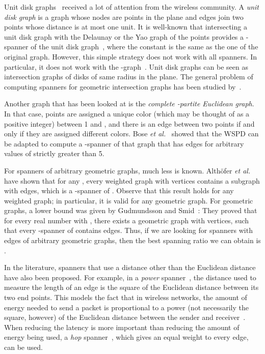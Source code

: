 \documentclass[pdftex,leqno,fleqn,12pt]{article}
\newcommand{\etal}{\textit{et al.}}
\begin{document}
Unit disk graphs~\cite{hale80,johnson90} received a lot of attention from the wireless community. A
\emph{unit disk graph} is a graph whose nodes are points in the plane and edges join two points
whose distance is at most one unit. It is well-known that intersecting a unit disk graph with the
Delaunay or the Yao graph of the points provides a -spanner of the unit disk
graph~\cite{bose04}, where the constant  is the same as the one of the original graph. However,
this simple strategy does not work with all spanners. In particular, it does not work with the
-graph~\cite{couture07c}. Unit disk graphs can be seen as intersection graphs of disks of
same radius in the plane. The general problem of computing spanners for geometric intersection
graphs has been studied by~\citet{furer07}.

Another graph that has been looked at is the \emph{complete -partite Euclidean graph}. In that
case, points are assigned a unique color (which may be thought of as a positive integer) between 1
and , and there is an edge between two points if and only if they are assigned different colors.
Bose \etal~\cite{couture07bispanReport} showed that the WSPD can be adapted to compute a
-spanner of that graph that has  edges for arbitrary values of  strictly greater than
5.

For spanners of arbitrary geometric graphs, much less is known. Alth{\"o}fer \emph{et
al.}~\cite{addjs-sswg-93} have shown that for any , every weighted graph  with  vertices
contains a subgraph with  edges, which is a -spanner of . Observe that this
result holds for any weighted graph; in particular, it is valid for any geometric graph. For
geometric graphs, a lower bound was given by Gudmundsson and Smid~\cite{gs-osogg-06}: They proved
that for every real number  with , there exists a geometric graph
 with  vertices, such that every -spanner of  contains  edges.
Thus, if we are looking for spanners with  edges of arbitrary geometric graphs, then the best
spanning ratio we can obtain is .

In the literature, spanners that use a distance other than the Euclidean distance have also been
proposed. For example, in a \emph{power}
spanner~\cite{aurenhammer87,li01,grunewald02,schindelhauer04}, the distance used to measure the
length of an edge is the square of the Euclidean distance between its two end points. This models
the fact that in wireless networks, the amount of energy needed to send a packet is proportional to
a power (not necessarily the square, however) of the Euclidean distance between the sender and
receiver~\cite{pahlavan95}. When reducing the latency is more important than reducing the amount of
energy being used, a \emph{hop} spanner~\cite{alzoubi03}, which gives an equal weight to every
edge, can be used.
\end{document}
